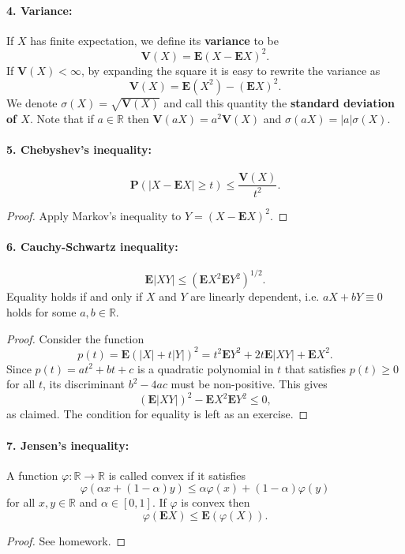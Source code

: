\documentclass[12pt]{article}
\newcommand{\R}{\mathbb{R}}
\newcommand{\prob}{\mathbf{P}}
\newcommand{\expec}{\mathbf{E}}
\newcommand{\var}{\mathbf{V}}
\theoremstyle{example}
\begin{document}
\paragraph{4. Variance:} If $X$ has finite expectation, we define its \textbf{variance} to be
$$ \var(X) = \expec(X-\expec X)^2. $$
If $\var(X)<\infty$, by expanding the square it is easy to rewrite the variance as
$$ \var(X) = \expec(X^2)-(\expec X)^2. $$
We denote $\sigma(X) = \sqrt{\var(X)}$ and call this quantity the \textbf{standard deviation of $X$}. Note that if $a\in \R$ then $\var(a X) = a^2 \var(X)$ and $\sigma(a X)=|a| \sigma(X)$.

\paragraph{5. Chebyshev's inequality:}
$$ \prob ( | X-\expec X| \ge t) \le \frac{\var(X)}{t^2}. $$
\begin{proof}
Apply Markov's inequality to $Y=(X-\expec X)^2$.
\end{proof}

\paragraph{6. Cauchy-Schwartz inequality:} 
$$ \expec|XY| \le \left(\expec X^2 \expec Y^2\right)^{1/2}. $$
Equality holds if and only if $X$ and $Y$ are linearly dependent, i.e. $aX+bY\equiv 0$ holds for some $a,b\in \R$.
\begin{proof} Consider the function $$ p(t) = \expec(|X| + t |Y|)^2 = t^2 \expec Y^2 + 2t \expec|XY|
+ \expec X^2.$$
Since $p(t)=at^2+bt+c$ is a quadratic polynomial in $t$ that satisfies $p(t)\ge 0$ for all $t$, its discriminant $b^2-4ac$ must be non-positive. This gives
$$ (\expec|XY|)^2 - \expec X^2 \expec Y^2 \le 0, $$
as claimed. The condition for equality is left as an exercise.
\end{proof}

\paragraph{7. Jensen's inequality:} A function $\varphi:\R\to\R$ is called convex if it satisfies 
$$\varphi(\alpha x + (1-\alpha)y) \le \alpha \varphi(x)+(1-\alpha)\varphi(y)$$ for all $x,y\in\R$ and $\alpha\in [0,1]$. If $\varphi$ is convex then
$$ \varphi(\expec X) \le \expec (\varphi(X)). $$

\begin{proof} See homework.
\end{proof}
\end{document}
